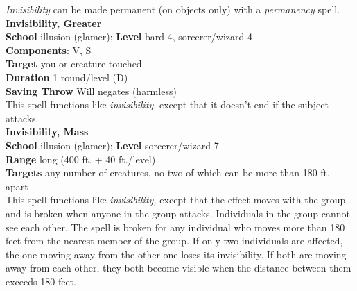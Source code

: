 \textit{Invisibility }can be made permanent (on objects only) with a \textit{permanency }spell.\\
\textbf{Invisibility, Greater}\\
\textbf{School} illusion (glamer); \textbf{Level} bard 4, sorcerer/wizard 4\\
\textbf{Components}: V, S\\
\textbf{Target} you or creature touched\\
\textbf{Duration} 1 round/level (D)\\
\textbf{Saving Throw }Will negates (harmless)\\
This spell functions like \textit{invisibility}, except that it doesn't end if the subject attacks.\\
\textbf{Invisibility, Mass}\\
\textbf{School} illusion (glamer); \textbf{Level} sorcerer/wizard 7\\
\textbf{Range} long (400 ft. + 40 ft./level)\\
\textbf{Targets} any number of creatures, no two of which can be more than 180 ft. apart\\
This spell functions like \textit{invisibility, }except that the effect moves with the group and is broken when anyone in the group attacks. Individuals in the group cannot see each other. The spell is broken for any individual who moves more than 180 feet from the nearest member of the group. If only two individuals are affected, the one moving away from the other one loses its invisibility. If both are moving away from each other, they both become visible when the distance between them exceeds 180 feet.\\

